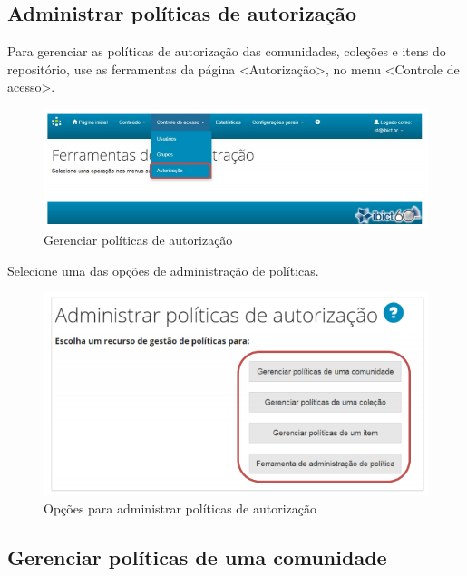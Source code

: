 \documentclass[12pt,hidelinks]{article}
\begin{document}
\newpage
    
    \subsection{Administrar políticas de autorização}
    
    Para gerenciar as políticas de autorização das comunidades, coleções e itens do repositório, use as ferramentas da página <Autorização>, no menu <Controle de acesso>.
    
    \begin{figure}[!htp]
                \centering
                \includegraphics[scale=0.7]{figura/Figura71.png}
                \caption{Gerenciar políticas de autorização}
            \label{Rotulo}
        \end{figure}
    
    Selecione uma das opções de administração de políticas.
    
    \begin{figure}[!htp]
                \centering
                \includegraphics[scale=0.7]{figura/Figura72.png}
                \caption{Opções para administrar políticas de autorização}
            \label{Rotulo}
        \end{figure}
    
    \subsection{Gerenciar políticas de uma comunidade}
    
\end{document}
